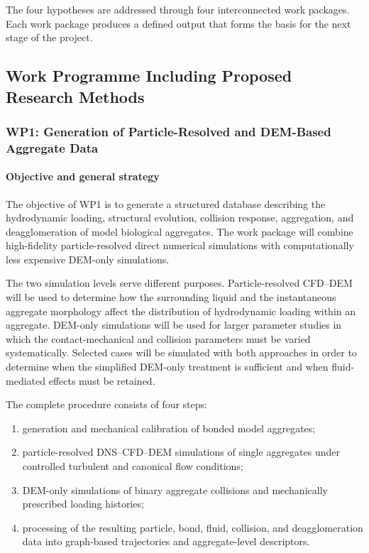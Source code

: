 \documentclass[11pt,a4paper,twoside]{scrartcl}
\begin{document}
The four hypotheses are addressed through four interconnected work packages. Each work package produces a defined output that forms the basis for the next stage of the project.


\subsection{Work Programme Including Proposed Research Methods}

\subsubsection{WP1: Generation of Particle-Resolved and DEM-Based Aggregate Data}

\paragraph{Objective and general strategy}

The objective of WP1 is to generate a structured database describing the hydrodynamic loading, structural evolution, collision response, aggregation, and deagglomeration of model biological aggregates. The work package will combine high-fidelity particle-resolved direct numerical simulations with computationally less expensive DEM-only simulations.

The two simulation levels serve different purposes. Particle-resolved CFD--DEM will be used to determine how the surrounding liquid and the instantaneous aggregate morphology affect the distribution of hydrodynamic loading within an aggregate. DEM-only simulations will be used for larger parameter studies in which the contact-mechanical and collision parameters must be varied systematically. Selected cases will be simulated with both approaches in order to determine when the simplified DEM-only treatment is sufficient and when fluid-mediated effects must be retained.

The complete procedure consists of four steps:

\begin{enumerate}
	\item generation and mechanical calibration of bonded model aggregates;
	
	\item particle-resolved DNS--CFD--DEM simulations of single aggregates under controlled turbulent and canonical flow conditions;
	
	\item DEM-only simulations of binary aggregate collisions and mechanically prescribed loading histories;
	
	\item processing of the resulting particle, bond, fluid, collision, and deagglomeration data into graph-based trajectories and aggregate-level descriptors.
\end{enumerate}
\end{document}
